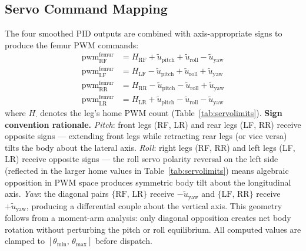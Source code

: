 \documentclass[journal]{IEEEtran}
\begin{document}
\subsection{Servo Command Mapping}
\label{subsec:cmdmap}
The four smoothed PID outputs are combined with axis-appropriate
signs to produce the femur PWM commands:
\begin{align}
\text{pwm}_\text{RF}^\text{femur} &= H_\text{RF}
  + \tilde{u}_\text{pitch} + \tilde{u}_\text{roll}
  - \tilde{u}_\text{yaw} \label{eq:rf}\\
\text{pwm}_\text{LF}^\text{femur} &= H_\text{LF}
  - \tilde{u}_\text{pitch} + \tilde{u}_\text{roll}
  + \tilde{u}_\text{yaw} \label{eq:lf}\\
\text{pwm}_\text{RR}^\text{femur} &= H_\text{RR}
  - \tilde{u}_\text{pitch} - \tilde{u}_\text{roll}
  + \tilde{u}_\text{yaw} \label{eq:rr}\\
\text{pwm}_\text{LR}^\text{femur} &= H_\text{LR}
  + \tilde{u}_\text{pitch} - \tilde{u}_\text{roll}
  - \tilde{u}_\text{yaw} \label{eq:lr}
\end{align}
where $H_{\cdot}$ denotes the leg's home PWM count
(Table~\ref{tab:servolimits}).
\textbf{Sign convention rationale.}
\textit{Pitch}: front legs (RF, LR) and rear legs (LF, RR)
receive opposite signs --- extending front legs while retracting
rear legs (or vice versa) tilts the body about the lateral axis.
\textit{Roll}: right legs (RF, RR) and left legs (LF, LR) receive
opposite signs --- the roll servo polarity reversal on the left side
(reflected in the larger home values in Table~\ref{tab:servolimits})
means algebraic opposition in PWM space produces symmetric body
tilt about the longitudinal axis.
\textit{Yaw}: the diagonal pairs
$\{\text{RF},\,\text{LR}\}$ receive $-\tilde{u}_\text{yaw}$ and
$\{\text{LF},\,\text{RR}\}$ receive $+\tilde{u}_\text{yaw}$,
producing a differential couple about the vertical axis.
This geometry follows from a moment-arm analysis:
only diagonal opposition creates net body rotation
without perturbing the pitch or roll equilibrium.
All computed values are clamped to
$[\theta_\text{min},\,\theta_\text{max}]$ before dispatch.
\end{document}
